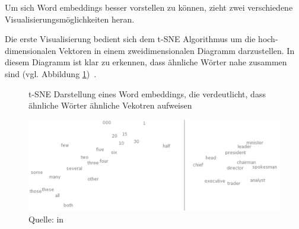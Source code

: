 \documentclass{hwz}
\begin{document}
Um sich Word embeddings besser vorstellen zu können, zieht \textcite{Olah2014DeepRepresentations} zwei verschiedene Visualisierungsmöglichkeiten heran.

Die erste Visualisierung bedient sich dem t-SNE Algorithmus um die hoch-dimensionalen Vektoren in einem zweidimensionalen Diagramm darzustellen. In diesem Diagramm ist klar zu erkennen, dass ähnliche Wörter nahe zusammen sind (vgl. Abbildung \ref{wordembeddingtsne})~\autocite{Olah2014DeepRepresentations}.
\begin{figure}[h]
    \centering
    \caption{t-SNE Darstellung eines Word embeddings, die verdeutlicht, dass ähnliche Wörter ähnliche Vekotren aufweisen}
    \includegraphics[width=\textwidth]{graphics/wordmebeddingtsne.png}
    \caption*{Quelle: \textcite{Turian2010WordLearning} in \textcite{Olah2014DeepRepresentations}}
    \label{wordembeddingtsne}
\end{figure}
\end{document}
